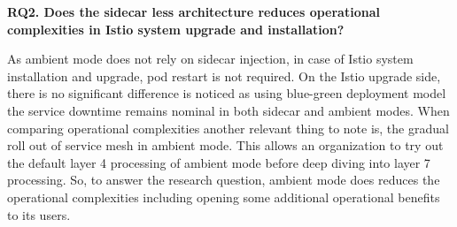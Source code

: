 \textbf{RQ2. Does the sidecar less architecture reduces operational complexities in Istio system upgrade and installation?}

As ambient mode does not rely on sidecar injection, in case of Istio system installation and upgrade, pod restart is not required. On the Istio upgrade side, there is no significant difference is noticed as using blue-green deployment model the service downtime remains nominal in both sidecar and ambient modes. When comparing operational complexities another relevant thing to note is, the gradual roll out of service mesh in ambient mode. This allows an organization to try out the default layer 4 processing of ambient mode before deep diving into layer 7 processing. So, to answer the research question, ambient mode does reduces the operational complexities including opening some additional operational benefits to its users.

